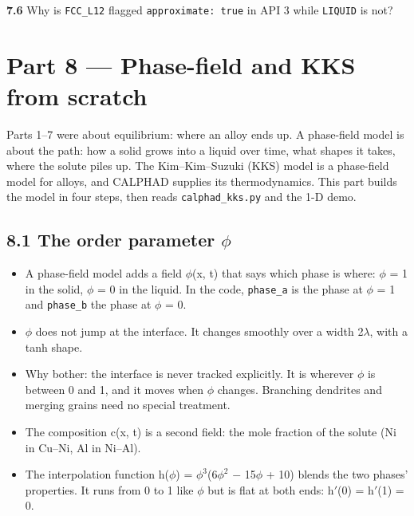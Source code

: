 \documentclass[12pt,a4paper]{article}
\begin{document}
\textbf{7.6} Why is \texttt{FCC\_\allowbreak{}L12} flagged \texttt{approximate: true} in API 3 while \texttt{LIQUID} is not?


\section*{Part 8 --- Phase-field and KKS from scratch}
Parts 1--7 were about equilibrium: where an alloy ends up. A phase-field model is about the path: how a solid grows into a liquid over time, what shapes it takes, where the solute piles up. The Kim--Kim--Suzuki (KKS) model is a phase-field model for alloys, and CALPHAD supplies its thermodynamics. This part builds the model in four steps, then reads \texttt{calphad\_\allowbreak{}kks.\allowbreak{}py} and the 1-D demo.


\subsection*{8.1 The order parameter \texorpdfstring{\(\phi\)}{phi}}
\begin{itemize}
\item A phase-field model adds a field \(\phi\)(x, t) that says which phase is where: \(\phi\) = 1 in the solid, \(\phi\) = 0 in the liquid. In the code, \texttt{phase\_\allowbreak{}a} is the phase at \(\phi\) = 1 and \texttt{phase\_\allowbreak{}b} the phase at \(\phi\) = 0.
\item \(\phi\) does not jump at the interface. It changes smoothly over a width 2\(\lambda\), with a tanh shape.
\item Why bother: the interface is never tracked explicitly. It is wherever \(\phi\) is between 0 and 1, and it moves when \(\phi\) changes. Branching dendrites and merging grains need no special treatment.
\item The composition c(x, t) is a second field: the mole fraction of the solute (Ni in Cu--Ni, Al in Ni--Al).
\item The interpolation function h(\(\phi\)) = \(\phi ^{3}\)(6\(\phi ^{2}\) \(-\) 15\(\phi\) + 10) blends the two phases' properties. It runs from 0 to 1 like \(\phi\) but is flat at both ends: h\('\)(0) = h\('\)(1) = 0.
\end{itemize}

\end{document}
